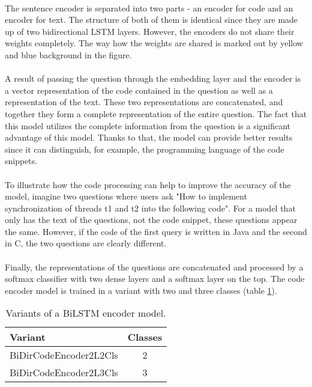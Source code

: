 \paragraph{}
The sentence encoder is separated into two parts - an encoder for code and an encoder for text. The structure of both of them is identical since they are made up of two bidirectional LSTM layers. However, the encoders do not share their weights completely. The way how the weights are shared is marked out by yellow and blue background in the figure.

\paragraph{}
A result of passing the question through the embedding layer and the encoder is a vector representation of the code contained in the question as well as a representation of the text. These two representations are concatenated, and together they form a complete representation of the entire question. The fact that this model utilizes the complete information from the question is a significant  advantage of this model. Thanks to that, the model can provide better results since it can distinguish, for example, the programming language of the code snippets. 

\paragraph{}
To illustrate how the code processing can help to improve the accuracy of the model, imagine two questions where users ask "How to implement synchronization of threads t1 and t2 into the following code". For a model that only has the text of the questions, not the code snippet, these questions appear the same. However, if the code of the first query is written in Java and the second in C, the two questions are clearly different.

\paragraph{}
Finally, the representations of the questions are concatenated and processed by a softmax classifier with two dense layers and a softmax layer on the top. The code encoder model is trained in a variant with two and three classes (table \ref{bi_lstm_code_encoder_variants}).

\begin{table}[!h]
	\begin{center}
		\begin{tabular}{l c} 
			\hline
			\textbf{Variant} & \textbf{Classes}\\ [0.5ex] 
			\hline\hline
			BiDirCodeEncoder2L2Cls & 2 \\ 
			BiDirCodeEncoder2L3Cls & 3 \\ 
			\hline
		\end{tabular}
	\end{center}
	\caption{Variants of a BiLSTM encoder model.}
	\label{bi_lstm_code_encoder_variants}
\end{table}

